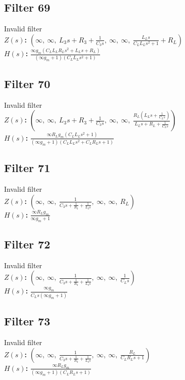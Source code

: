 \documentclass{article}
\begin{document}
\subsection*{Filter 69}
Invalid filter \\ 
\textbf{$Z(s)$:} $\left( \infty, \  \infty, \  L_{3} s + R_{3} + \frac{1}{C_{3} s}, \  \infty, \  \infty, \  \frac{L_{L} s}{C_{L} L_{L} s^{2} + 1} + R_{L}\right)$ \\ 
\textbf{$H(s)$:} $\frac{\infty g_{m} \left(C_{L} L_{L} R_{L} s^{2} + L_{L} s + R_{L}\right)}{\left(\infty g_{m} + 1\right) \left(C_{L} L_{L} s^{2} + 1\right)}$ \\ 
\subsection*{Filter 70}
Invalid filter \\ 
\textbf{$Z(s)$:} $\left( \infty, \  \infty, \  L_{3} s + R_{3} + \frac{1}{C_{3} s}, \  \infty, \  \infty, \  \frac{R_{L} \left(L_{L} s + \frac{1}{C_{L} s}\right)}{L_{L} s + R_{L} + \frac{1}{C_{L} s}}\right)$ \\ 
\textbf{$H(s)$:} $\frac{\infty R_{L} g_{m} \left(C_{L} L_{L} s^{2} + 1\right)}{\left(\infty g_{m} + 1\right) \left(C_{L} L_{L} s^{2} + C_{L} R_{L} s + 1\right)}$ \\ 
\subsection*{Filter 71}
Invalid filter \\ 
\textbf{$Z(s)$:} $\left( \infty, \  \infty, \  \frac{1}{C_{3} s + \frac{1}{R_{3}} + \frac{1}{L_{3} s}}, \  \infty, \  \infty, \  R_{L}\right)$ \\ 
\textbf{$H(s)$:} $\frac{\infty R_{L} g_{m}}{\infty g_{m} + 1}$ \\ 
\subsection*{Filter 72}
Invalid filter \\ 
\textbf{$Z(s)$:} $\left( \infty, \  \infty, \  \frac{1}{C_{3} s + \frac{1}{R_{3}} + \frac{1}{L_{3} s}}, \  \infty, \  \infty, \  \frac{1}{C_{L} s}\right)$ \\ 
\textbf{$H(s)$:} $\frac{\infty g_{m}}{C_{L} s \left(\infty g_{m} + 1\right)}$ \\ 
\subsection*{Filter 73}
Invalid filter \\ 
\textbf{$Z(s)$:} $\left( \infty, \  \infty, \  \frac{1}{C_{3} s + \frac{1}{R_{3}} + \frac{1}{L_{3} s}}, \  \infty, \  \infty, \  \frac{R_{L}}{C_{L} R_{L} s + 1}\right)$ \\ 
\textbf{$H(s)$:} $\frac{\infty R_{L} g_{m}}{\left(\infty g_{m} + 1\right) \left(C_{L} R_{L} s + 1\right)}$ \\ 
\end{document}
